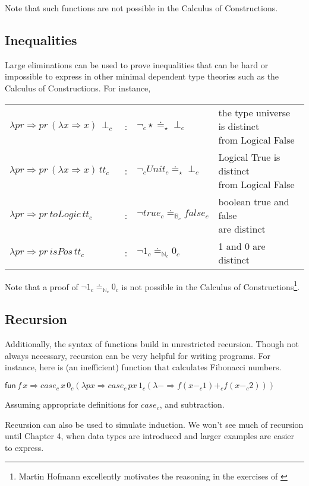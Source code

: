Note that such functions are not possible in the Calculus of Constructions.

\subsection{Inequalities}

Large eliminations can be used to prove inequalities that can be hard or impossible to express in other minimal dependent type theories such as the Calculus of Constructions.
For instance,

\begin{tabular}{lcll}
  $\lambda pr\Rightarrow pr\,\left(\lambda x\Rightarrow x\right)\,\perp_{c}$ & : & $\lnot_{c}\star\doteq_{\star}\perp_{c}$ & \makecell{the type universe is distinct\\ from Logical False}\tabularnewline
  $\lambda pr\Rightarrow pr\,\left(\lambda x\Rightarrow x\right)\,tt_{c}$ & : & $\lnot_{c}Unit_{c}\doteq_{\star}\perp_{c}$ &  \makecell{Logical True is distinct\\ from Logical False}\tabularnewline
  $\lambda pr\Rightarrow pr\,toLogic\,tt_{c}$ & : & $\lnot true_{c}\doteq_{\mathbb{B}_{c}}false_{c}$ &  \makecell{boolean true and false\\ are distinct}\tabularnewline
  $\lambda pr\Rightarrow pr\,isPos\,tt_{c}$ & : & $\lnot1_{c}\doteq_{\mathbb{N}_{c}}0_{c}$ & 1 and 0 are distinct\tabularnewline
  \end{tabular}
  


Note that a proof of $\lnot1_{c}\doteq_{\mathbb{N}_{c}}0_{c}$ is not possible in the Calculus of Constructions\cite{10.2307/2274575}\footnote{
  Martin Hofmann excellently motivates the reasoning in the exercises of \cite{hofmann_1997}}.

\subsection{Recursion}

Additionally, the syntax of functions build in unrestricted recursion.
Though not always necessary, recursion can be very helpful for writing programs.
For instance, here is (an inefficient) function that calculates Fibonacci numbers.

$\mathsf{fun}\,f\,x\Rightarrow case_{c}\,x\,0_{c}\left(\lambda px\Rightarrow case_{c}\,px\,1_{c}\left(\lambda-\Rightarrow f\left(x-_{c}1\right)+_{c}f\left(x-_{c}2\right)\right)\right)$

Assuming appropriate definitions for $case_{c}$, and subtraction.

Recursion can also be used to simulate induction. 
We won't see much of recursion until Chapter 4, when data types are introduced and larger examples are easier to express.
